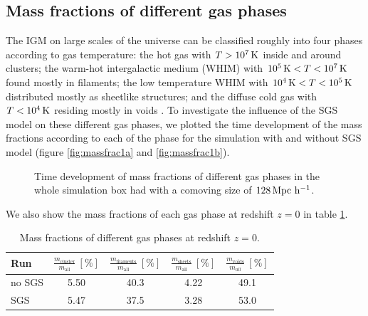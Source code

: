 \subsection{Mass fractions of different gas phases}
The IGM on large scales of the universe can be classified roughly into four
phases according to gas temperature: the hot gas with $T > \unit[10^7]{K}$
inside and around clusters; the warm-hot intergalactic medium (WHIM) with
$\unit[10^5]{K} < T < \unit[10^7]{K}$ found mostly in filaments; the low
temperature WHIM with $\unit[10^4]{K} < T < \unit[10^5]{K}$ distributed mostly
as sheetlike structures; and the diffuse cold gas with $T < \unit[10^4]{K}$
residing mostly in voids \citep{Cen1999,Kang2005}. To investigate the influence
of the SGS model on these different gas phases, we plotted the time development
of the mass fractions according to each of the phase for the simulation with
and without SGS model (figure \ref{fig:massfrac1a} and \ref{fig:massfrac1b}).
\begin{figure}[tp]
\centering
{}
\caption{Time development of mass fractions of different gas phases in the
whole simulation box had with a comoving size of
$\unit[128]{Mpc\ h^{-1}}$.}
\end{figure}
We also show the mass fractions of each gas phase at redshift $z=0$ in table
\ref{tab:massfrac1}. 
\begin{table}[htbp]
\begin{center}
\begin{tabular}{lcccc}
\hline
Run & 
$\frac{m_{\text{cluster}}}{m_{\text{all}}}\ [\%]$ &
$\frac{m_{\text{filaments}}}{m_{\text{all}}}\ [\%]$ &
$\frac{m_{\text{sheets}}}{m_{\text{all}}}\ [\%]$ & 
$\frac{m_{\text{voids}}}{m_{all}}\ [\%]$ \vspace*{1mm} \\
\hline
\hline
no SGS & 5.50 & 40.3 & 4.22 & 49.1\\ 
SGS & 5.47 & 37.5 & 3.28 & 53.0 \\
\hline
\end{tabular}
\end{center}
\caption{Mass fractions of different gas phases at redshift $z=0$.}
\label{tab:massfrac1}
\end{table}
